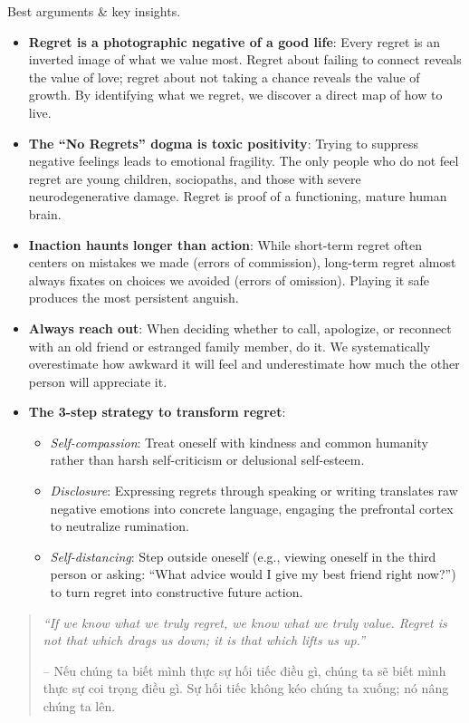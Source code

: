 \documentclass{article}
\begin{document}
\begin{enumerate}
	{\sf Best arguments \& key insights.}
	\begin{itemize}
		\item {\bf Regret is a photographic negative of a good life}: Every regret is an inverted image of what we value most. Regret about failing to connect reveals the value of love; regret about not taking a chance reveals the value of growth. By identifying what we regret, we discover a direct map of how to live.
		\item {\bf The ``No Regrets'' dogma is toxic positivity}: Trying to suppress negative feelings leads to emotional fragility. The only people who do not feel regret are young children, sociopaths, and those with severe neurodegenerative damage. Regret is proof of a functioning, mature human brain.
		\item {\bf Inaction haunts longer than action}: While short-term regret often centers on mistakes we made (errors of commission), long-term regret almost always fixates on choices we avoided (errors of omission). Playing it safe produces the most persistent anguish.
		\item {\bf Always reach out}: When deciding whether to call, apologize, or reconnect with an old friend or estranged family member, do it. We systematically overestimate how awkward it will feel and underestimate how much the other person will appreciate it.
		\item {\bf The 3-step strategy to transform regret}:
		\begin{itemize}
			\item {\it Self-compassion}: Treat oneself with kindness and common humanity rather than harsh self-criticism or delusional self-esteem.
			\item {\it Disclosure}: Expressing regrets through speaking or writing translates raw negative emotions into concrete language, engaging the prefrontal cortex to neutralize rumination.
			\item {\it Self-distancing}: Step outside oneself (e.g., viewing oneself in the third person or asking: ``What advice would I give my best friend right now?'') to turn regret into constructive future action.
		\end{itemize}
	\end{itemize}
	\begin{quotation}
		{\it``If we know what we truly regret, we know what we truly value. Regret is not that which drags us down; it is that which lifts us up.''}

		-- Nếu chúng ta biết mình thực sự hối tiếc điều gì, chúng ta sẽ biết mình thực sự coi trọng điều gì. Sự hối tiếc không kéo chúng ta xuống; nó nâng chúng ta lên.


\end{quotation}
\end{enumerate}
\end{document}
